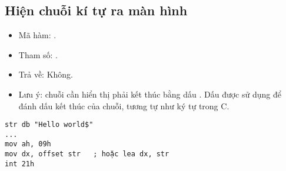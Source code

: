 \documentclass[main.tex]{subfiles}
\begin{document}
\subsection{Hiện chuỗi kí tự ra màn hình} \label{subsec:xuatchuoi}
\begin{itemize}
    \item Mã hàm: .
    \item Tham số: .
    \item Trả về: Không.
    \item Lưu ý: chuỗi cần hiển thị phải kết thúc bằng dấu . Dấu  được sử dụng để đánh dấu kết thúc của chuỗi, tương tự như ký tự  trong C.
\end{itemize}
\begin{verbatim}
str db "Hello world$"
... 
mov ah, 09h 
mov dx, offset str   ; hoặc lea dx, str
int 21h
\end{verbatim}
\end{document}
